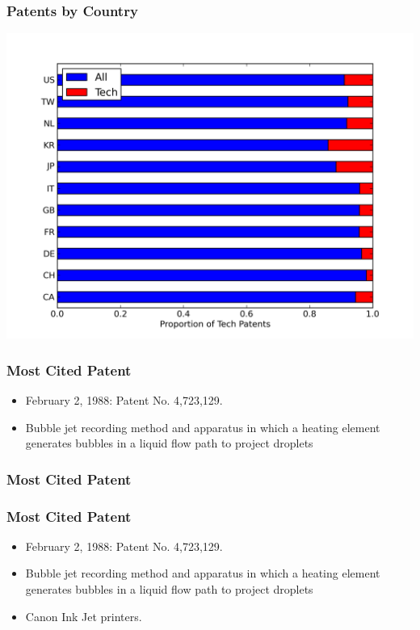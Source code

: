 \documentclass{beamer}
\begin{document}
\begin{frame}[t]\frametitle{Patents by Country} 

\begin{center}
  \includegraphics[scale=.5]{by_country_normalized.png}
  \label{fig:by_country_normalized}
\end{center}
\end{frame}

\begin{frame}[t]\frametitle{Most Cited Patent} 
  \begin{itemize}
    \item<+-> February 2, 1988: Patent No. 4,723,129.
    \item<+-> Bubble jet recording method and apparatus in which a heating element generates bubbles in a liquid flow path to project droplets 
  \end{itemize}
\end{frame}

\begin{frame}[t]\frametitle{Most Cited Patent} 
\begin{frame}[t]\frametitle{Most Cited Patent} 
  \begin{itemize}
    \item February 2, 1988: Patent No. 4,723,129.
    \item Bubble jet recording method and apparatus in which a heating element generates bubbles in a liquid flow path to project droplets 
    \item Canon Ink Jet printers.
  \end{itemize}
\end{frame}

\end{frame}
\end{document}
